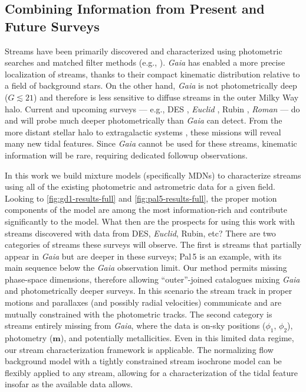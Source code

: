 \documentclass[twocolumn]{aastex631}
\newcommand{\stream}[1]{#1}
\newcommand{\dataarchive}[1]{\textit{#1}}
\newcommand{\Gaia}{\dataarchive{Gaia}}
\newcommand{\mbs}[1]{\boldsymbol{#1}}
\begin{document}

    \subsection{Combining Information from Present and Future Surveys} \label{sub:future_surveys}

        Streams have been primarily discovered and characterized using
        photometric searches and matched filter methods (e.g.,
        \citealt{Rockosi+2002, Grillmair2014, Bonaca+2012, Jethwa+2018,
        Shipp+2018}).  \Gaia{} has enabled a more precise localization of
        streams, thanks to their  compact kinematic distribution relative to a
        field of background stars.  On the other hand, \Gaia{} is not
        photometrically deep ($G\lesssim 21$) and therefore is less sensitive to
        diffuse streams in the outer Milky Way halo.  Current and upcoming
        surveys --- e.g., DES \citep{Abbott+2018, Abbott+2021}, \textit{Euclid}
        \citep{Laureijs+2011}, Rubin \citep{Ivezic+2019}, \textit{Roman}
        \citep{Spergel+2013} --- do and will probe much deeper photometrically
        than \Gaia{} can detect.  From the more distant stellar halo
        \citep{Shipp+2018} to extragalactic systems
        \citep{Martinez-Delgado+2008, Demirjian+2020, Roman+2023}, these
        missions will reveal many new tidal features. Since \Gaia{} cannot be
        used for these streams, kinematic information will be rare, requiring
        dedicated followup observations.

        
        In this work we build mixture models (specifically MDNs) to characterize
        streams using all of the existing photometric and astrometric data for a
        given field. Looking to \autoref{fig:gd1-results-full} and
        \autoref{fig:pal5-results-full}, the proper motion components of the
        model are among the most information-rich and contribute significantly
        to the model. What then are the prospects for using this work with
        streams discovered with data from DES, \textit{Euclid}, Rubin, etc?
        There are two categories of streams these surveys will observe. The
        first is streams that partially appear in \Gaia{} but are deeper in
        these surveys; \stream{Pal\,5} is an example, with its main sequence
        below the \Gaia{} observation limit. Our method permits missing
        phase-space dimensions, therefore allowing ``outer''-joined catalogues
        mixing \Gaia{} and photometrically deeper surveys. In this scenario the
        stream track in proper motions and parallaxes (and possibly radial
        velocities) communicate and are mutually constrained with the
        photometric tracks. The second category is streams entirely missing from
        \Gaia{}, where the data is on-sky positions ($\phi_1$, $\phi_2$),
        photometry ($\mbs{m}$), and potentially metallicities. Even in this
        limited data regime,  our stream characterization framework is
        applicable. The  normalizing flow background model with a tightly
        constrained stream isochrone model can be flexibly applied to any
        stream, allowing for a characterization of the tidal feature insofar as
        the available data allows.  
        
\end{document}
